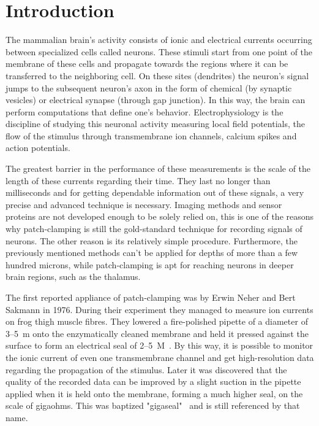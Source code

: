 \documentclass[12pt,a4paper]{report}
\begin{document}
\chapter{Introduction}
The mammalian brain's activity consists of ionic and electrical currents occurring between specialized cells called neurons. These stimuli start from one point of the membrane of these cells and propagate towards the regions where it can be transferred to the neighboring cell. On these sites (dendrites) the neuron's signal jumps to the subsequent neuron's axon in the form of chemical (by synaptic vesicles) or electrical synapse (through gap junction). In this way, the brain can perform computations that define one's behavior. Electrophysiology is the discipline of studying this neuronal activity measuring local field potentials, the flow of the stimulus through transmembrane ion channels, calcium spikes and action potentials.\par
The greatest barrier in the performance of these measurements is the scale of the length of these currents regarding their time. They last no longer than milliseconds and for getting dependable information out of these signals, a very precise and advanced technique is necessary. Imaging methods and sensor proteins are not developed enough to be solely relied on, this is one of the reasons why patch-clamping is still the gold-standard technique for recording signals of neurons. The other reason is its relatively simple procedure. Furthermore, the previously mentioned methods can't be applied for depths of more than a few hundred microns, while patch-clamping is apt for reaching neurons in deeper brain regions, such as the thalamus.\par
The first reported appliance of patch-clamping was by Erwin Neher and Bert Sakmann in 1976. During their experiment they managed to measure ion currents on frog thigh muscle fibres. They lowered a fire-polished pipette of a diameter of 3--5~\textmu m onto the enzymatically cleaned membrane and held it pressed against the surface to form an electrical seal of 2--5~M\textOmega~\cite{neher1976}. By this way, it is possible to monitor the ionic current of even one transmembrane channel and get high-resolution data regarding the propagation of the stimulus. Later it was discovered that the quality of the recorded data can be improved by a slight suction in the pipette applied when it is held onto the membrane, forming a much higher seal, on the scale of gigaohms. This was baptized "gigaseal"~\cite{hamill1981} and is still referenced by that name.
\end{document}
